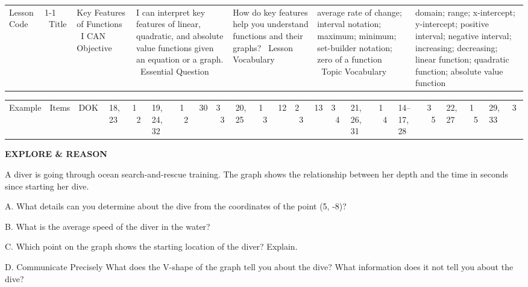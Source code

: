\documentclass{article}
\newenvironment{lesson-meta}{}{}        %
\newenvironment{item-analysis}{}{}      %
\newenvironment{model-discuss}{}{}      %
\newcommand{\answer}[1]{}               %
\newcommand{\placeholder}[2]{}          %
\newcommand{\te}[1]{}                   %
\begin{document}
\begin{lesson-meta}
\begin{tabular}{ll}
Lesson Code & 1-1 \
Title & Key Features of Functions \
I CAN Objective & I can interpret key features of linear, quadratic, and absolute value functions given an equation or a graph. \
Essential Question & How do key features help you understand functions and their graphs? \
Lesson Vocabulary & average rate of change; interval notation; maximum; minimum; set-builder notation; zero of a function \
Topic Vocabulary & domain; range; x-intercept; y-intercept; positive interval; negative interval; increasing; decreasing; linear function; quadratic function; absolute value function
\end{tabular}
\end{lesson-meta}

\begin{item-analysis}
\begin{tabular}{lll}
\toprule
Example & Items & DOK \
\midrule
1 & 18, 23 & 1 \
2 & 19, 24, 32 & 1 \
2 & 30 & 3 \
3 & 20, 25 & 1 \
3 & 12 & 2 \
3 & 13 & 3 \
4 & 21, 26, 31 & 1 \
4 & 14--17, 28 & 3 \
5 & 22, 27 & 1 \
5 & 29, 33 & 3 \
\bottomrule
\end{tabular}
\end{item-analysis}

\begin{model-discuss}
\textbf{EXPLORE & REASON}

A diver is going through ocean search-and-rescue training. The graph shows the relationship between her depth and the time in seconds since starting her dive.

\placeholder{graph}{Diver beside a boat and a dashed V-shaped depth-versus-time graph. Horizontal axis Time (s), labeled (t), ticks 1 through 9; vertical axis Depth (ft), labeled (d), ticks 2, 0, -2, -4, -6, -8. The graph descends from (0,2), crosses the surface at (1,0), reaches the solid vertex (5,-8), labeled ``5 s, -8 ft,'' and rises to (9,0). Water surface is (d=0); a diver is pictured underwater near the rising branch.}

A. What details can you determine about the dive from the coordinates of the point (5, -8)?
\answer{The diver reached the lowest point of the dive, 8 ft below the surface of the water, 5 s after beginning the dive.}

B. What is the average speed of the diver in the water?
\te{The TE student page additionally asks: How can you tell from the graph?}
\answer{2 ft/s; Sample: There is a slope of 2 ft/s from (5,-8) to (9,0).}

C. Which point on the graph shows the starting location of the diver? Explain.
\answer{(0,2); This is the point when the time is 0 s and the dive begins.}

D. Communicate Precisely What does the V-shape of the graph tell you about the dive? What information does it not tell you about the dive?
\answer{The diver dove down and then swam back up. It does not tell you if the diver moved horizontally or how far she moved.}
\end{model-discuss}
\end{document}
